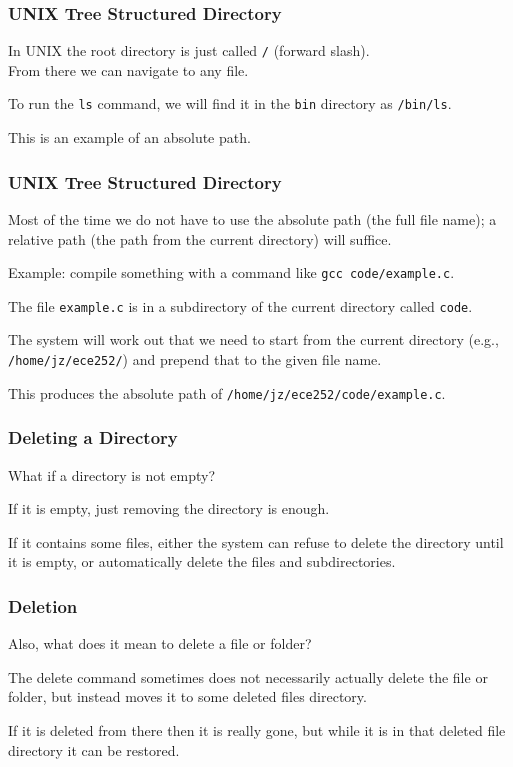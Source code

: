 \begin{frame}
	\frametitle{UNIX Tree Structured Directory}

	In UNIX the root directory is just called \texttt{/} (forward slash).\\
	\quad From there we can navigate to any file.

	To run the \texttt{ls} command, we will find it in the \texttt{bin} directory as \texttt{/bin/ls}.

	This is an example of an absolute path.

\end{frame}

\begin{frame}
	\frametitle{UNIX Tree Structured Directory}

	Most of the time we do not have to use the absolute path (the full file name); a relative path (the path from the current directory) will suffice.

	Example: compile something with a command like \texttt{gcc code/example.c}.

	The file \texttt{example.c} is in a subdirectory of the current directory called \texttt{code}.

	The system will work out that we need to start from the current directory (e.g., \texttt{/home/jz/ece252/}) and prepend that to the given file name.

	This produces the absolute path of \texttt{/home/jz/ece252/code/example.c}.

\end{frame}



\begin{frame}
	\frametitle{Deleting a Directory}

	What if a directory is not empty?

	If it is empty, just removing the directory is enough.

	If it contains some files, either the system can refuse to delete the directory until it is empty, or automatically delete the files and subdirectories.

\end{frame}

\begin{frame}
	\frametitle{Deletion}

	Also, what does it mean to delete a file or folder?

	The delete command sometimes does not necessarily actually delete the file or folder, but instead moves it to some deleted files directory.

	If it is deleted from there then it is really gone, but while it is in that deleted file directory it can be restored.

\end{frame}

